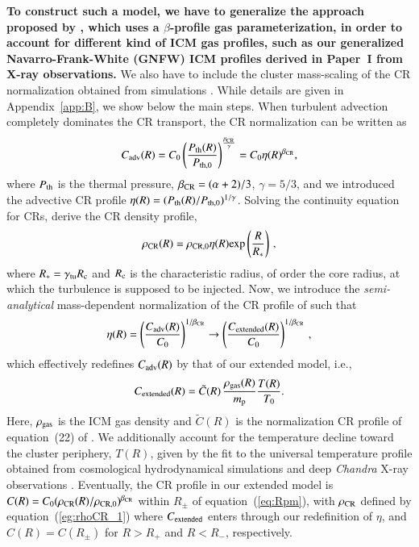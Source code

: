 \documentclass[useAMS,usenatbib]{mn2e}
\begin{document}
{\bf To construct such a model, we have to generalize the approach proposed by
\citet{2011A&A...527A..99E}, which uses a $\beta$-profile gas parameterization, 
in order to account for different kind of ICM gas profiles, such as our generalized 
Navarro-Frank-White (GNFW) ICM profiles derived in Paper~I from X-ray observations.} 
We also have to include the cluster mass-scaling of the
CR normalization obtained from simulations \citep{2010MNRAS.409..449P}. While
details are given in Appendix~\ref{app:B}, we show below the main steps. When
turbulent advection completely dominates the CR transport, the CR normalization
can be written as \citep{2011A&A...527A..99E}
\begin{equation}
C_{{\mathrm{adv}}}(R)=C_{0} \left( \frac{P_{{\mathrm{th}}}(R)}{P_{{\mathrm{th}},0}} \right)^{\frac{\beta_{{\mathrm{CR}}}}{\gamma}} = 
C_{0} \eta(R)^{\beta_{{\mathrm{CR}}}},
\label{eq:Csimple_1}
\end{equation} 
where $P_{{\mathrm{th}}}$ is the thermal pressure, $\beta_{{\mathrm{CR}}}=(\alpha+2)/3$, $\gamma=5/3$, 
and we introduced the advective CR profile $\eta(R)=(P_{{\mathrm{th}}}(R)/P_{{\mathrm{th}},0})^{1/\gamma}$. Solving the continuity
equation for CRs, \citet{2011A&A...527A..99E} derive the CR density profile,
\begin{equation}
\rho_{{\mathrm{CR}}}(R) = \rho_{{\mathrm{CR}},0} \eta(R) {\mathrm{exp}} \left( \frac{R}{R_{*}} \right) \, ,
\label{eg:rhoCR_1}
\end{equation} 
where $R_{*}=\gamma_{{\mathrm{{\mathrm{tu}}}}}R_{{\mathrm{c}}}$ and $R_{{\mathrm{c}}}$ is the characteristic 
radius, of order the core radius, at which the turbulence is supposed to be injected.
Now, we introduce the \emph{semi-analytical} mass-dependent normalization of the
CR profile of \cite{2010MNRAS.409..449P} such that
\begin{equation}
\eta(R) = \left( \frac{C_{{\mathrm{adv}}}(R)}{C_0} \right)^{1/\beta_{{\mathrm{CR}}}} \to
\left( \frac{C_{{\mathrm{extended}}}(R)}{C_0} \right)^{1/\beta_{{\mathrm{CR}}}} \, ,
\label{eq:eta}
\end{equation} 
which effectively redefines $C_{{\mathrm{adv}}}(R)$ by that of our extended model, i.e.,
\begin{equation}
C_{{\mathrm{extended}}}(R) =  \tilde{C}(R)\, \frac{\rho_{{\mathrm{gas}}}(R)}{m_{\mathrm{p}}} \frac{T(R)}{T_0}.
\label{eq:Cf}
\end{equation} 
Here, $\rho_{{\mathrm{gas}}}$ is the ICM gas density and $\tilde{C}(R)$ is the normalization 
CR profile of equation~(22) of \cite{2010MNRAS.409..449P}. We additionally account for the 
temperature decline toward the cluster periphery, $T(R)$, given by the fit to the universal
temperature profile obtained from cosmological hydrodynamical simulations
\citep{2007MNRAS.378..385P,2010MNRAS.409..449P} and deep {\em Chandra} X-ray
observations \citep{2005ApJ...628..655V}. Eventually, the CR profile in our
extended model is $C(R)=C_{0}(\rho_{{\mathrm{CR}}}(R) /
\rho_{{\mathrm{CR}},0})^{\beta_{{\mathrm{CR}}}}$ within $R_{\pm}$ of
equation~(\ref{eq:Rpm}), with $\rho_{{\mathrm{CR}}}$ defined by
equation~(\ref{eg:rhoCR_1}) where $C_{{\mathrm{extended}}}$ enters through our
redefinition of $\eta$, and $C(R) = C(R_{\pm})$ for $R > R_{+}$ and $R < R_{-}$,
respectively.
\end{document}
